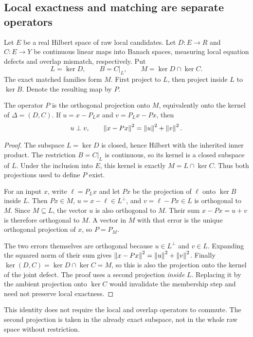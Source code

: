 \subsection{Local exactness and matching are separate operators}
Let \(E\) be a real Hilbert space of raw local candidates. Let \(D:E\to R\) and \(C:E\to Y\) be continuous linear maps into Banach spaces, measuring local equation defects and overlap mismatch, respectively. Put
\[
 L=\ker D,\qquad B=C|_L,
 \qquad M=\ker D\cap\ker C.
\]
The exact matched families form \(M\). First project to \(L\), then project inside \(L\) to \(\ker B\). Denote the resulting map by \(P\).

\begin{theorem}\label{KS46}
The operator \(P\) is the orthogonal projection onto \(M\), equivalently onto the kernel of \(\Delta=(D,C)\). If \(u=x-P_Lx\) and \(v=P_Lx-Px\), then
\[
 u\perp v,\qquad\left\lVert x-Px\right\rVert^2=\left\lVert u\right\rVert^2+\left\lVert v\right\rVert^2.
\]
\end{theorem}
\begin{proof}
The subspace \(L=\ker D\) is closed, hence Hilbert with the inherited inner product. The restriction \(B=C|_L\) is continuous, so its kernel is a closed subspace of \(L\). Under the inclusion into \(E\), this kernel is exactly \(M=L\cap\ker C\). Thus both projections used to define \(P\) exist.

For an input \(x\), write \(\ell=P_Lx\) and let \(Px\) be the projection of \(\ell\) onto \(\ker B\) inside \(L\). Then \(Px\in M\), \(u=x-\ell\in L^\perp\), and \(v=\ell-Px\in L\) is orthogonal to \(M\). Since \(M\subseteq L\), the vector \(u\) is also orthogonal to \(M\). Their sum \(x-Px=u+v\) is therefore orthogonal to \(M\). A vector in \(M\) with that error is the unique orthogonal projection of \(x\), so \(P=P_M\).

The two errors themselves are orthogonal because \(u\in L^\perp\) and \(v\in L\). Expanding the squared norm of their sum gives \(\left\lVert x-Px\right\rVert^2=\left\lVert u\right\rVert^2+\left\lVert v\right\rVert^2\). Finally \(\ker(D,C)=\ker D\cap\ker C=M\), so this is also the projection onto the kernel of the joint defect. The proof uses a second projection \emph{inside} \(L\). Replacing it by the ambient projection onto \(\ker C\) would invalidate the membership step and need not preserve local exactness.
\end{proof}
This identity does not require the local and overlap operators to commute. The second projection is taken in the already exact subspace, not in the whole raw space without restriction.

